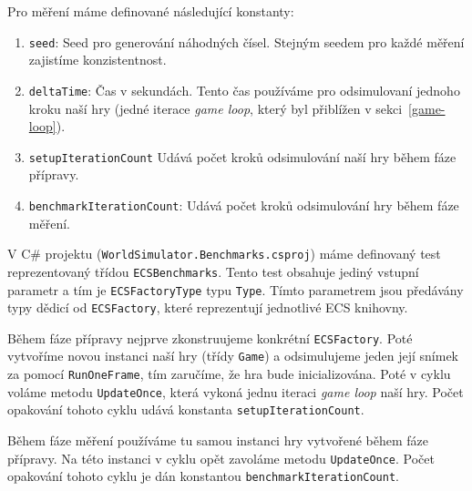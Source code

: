 Pro měření máme definované následující konstanty:

\begin{enumerate}
  \item \texttt{seed}: Seed pro generování náhodných čísel. Stejným seedem pro každé měření zajistíme konzistentnost.

  \item \texttt{deltaTime}: Čas v sekundách. Tento čas používáme pro odsimulovaní jednoho kroku naší hry (jedné iterace \textit{game loop}, který byl přiblížen v sekci~\ref{game-loop}).

  \item \texttt{setupIterationCount} Udává počet kroků odsimulování naší hry během fáze přípravy.

  \item \texttt{benchmarkIterationCount}: Udává počet kroků odsimulování hry během fáze měření.
\end{enumerate}

V C\# projektu (\texttt{WorldSimulator.Benchmarks.csproj}) máme definovaný test reprezentovaný třídou \texttt{ECSBenchmarks}. Tento test obsahuje jediný vstupní parametr a tím je \texttt{ECSFactoryType} typu \texttt{Type}. Tímto parametrem jsou předávány typy dědicí od \texttt{ECSFactory}, které reprezentují jednotlivé ECS knihovny.

Během fáze přípravy nejprve zkonstruujeme konkrétní \texttt{ECSFactory}. Poté vytvoříme novou instanci naší hry (třídy \texttt{Game}) a odsimulujeme jeden její snímek za pomocí \texttt{RunOneFrame}, tím zaručíme, že hra bude inicializována. Poté v cyklu voláme metodu \texttt{UpdateOnce}, která vykoná jednu iteraci \textit{game loop} naší hry. Počet opakování tohoto cyklu udává konstanta \texttt{setupIterationCount}.

Během fáze měření používáme tu samou instanci hry vytvořené během fáze přípravy. Na této instanci v cyklu opět zavoláme metodu \texttt{UpdateOnce}. Počet opakování tohoto cyklu je dán konstantou \texttt{benchmarkIterationCount}.












